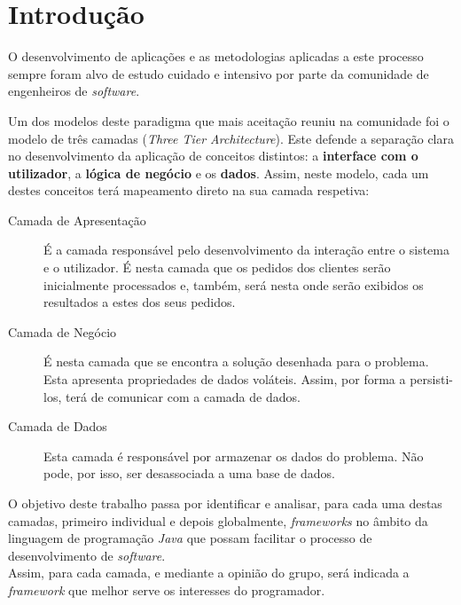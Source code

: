 \section{Introdução}

O desenvolvimento de aplicações e as metodologias aplicadas a este processo sempre foram alvo de estudo cuidado e intensivo por parte da comunidade de engenheiros de \textit{software}.

Um dos modelos deste paradigma que mais aceitação reuniu na comunidade foi o modelo de três camadas (\textit{Three Tier Architecture}).
Este defende a separação clara no desenvolvimento da aplicação de conceitos distintos: a \textbf{interface com o utilizador}, a \textbf{lógica de negócio} e os \textbf{dados}.
Assim, neste modelo, cada um destes conceitos terá mapeamento direto na sua camada respetiva:

\begin{description}

\item[Camada de Apresentação]
É a camada responsável pelo desenvolvimento da interação entre o sistema e o utilizador.
É nesta camada que os pedidos dos clientes serão inicialmente processados e, também, será nesta onde serão exibidos os resultados a estes dos seus pedidos.

\item[Camada de Negócio]
É nesta camada que se encontra a solução desenhada para o problema.
Esta apresenta propriedades de dados voláteis.
Assim, por forma a persisti-los, terá de comunicar com a camada de dados.

\item[Camada de Dados]
Esta camada é responsável por armazenar os dados do problema.
Não pode, por isso, ser desassociada a uma base de dados.

\end{description}

O objetivo deste trabalho passa por identificar e analisar, para cada uma destas camadas, primeiro individual e depois globalmente, \textit{frameworks} no âmbito da linguagem de programação \textit{Java} que possam facilitar o processo de desenvolvimento de \textit{software}.\\
Assim, para cada camada, e mediante a opinião do grupo, será indicada a \textit{framework} que melhor serve os interesses do programador.
